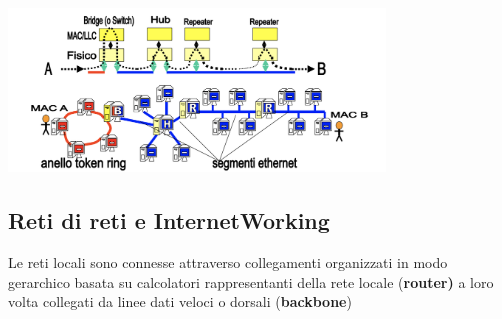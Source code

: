 \documentclass{article}
\begin{document}
\begin{center}
    \includegraphics[width=10cm]{img/reteLocale.png}
\end{center}

\subsection{Reti di reti e InternetWorking}

Le reti locali sono connesse attraverso collegamenti organizzati in modo gerarchico basata su calcolatori rappresentanti della rete locale (\textbf{router)} a loro volta collegati da linee dati veloci o dorsali (\textbf{backbone})
\end{document}
